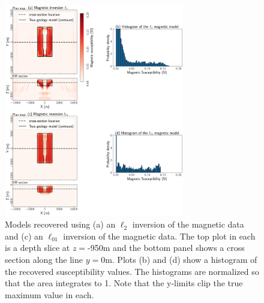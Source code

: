 \begin{figure}[!htb]
    \begin{center}
    \includegraphics[width=0.7\textwidth]{figures/magnetic_l22_lpq.png}
    \end{center}
\caption{
    Models recovered using (a) an $\ell_2$ inversion of the magnetic data and (c) an $\ell_{01}$ inversion of the magnetic data. The top plot in each is a depth slice at $z=$-950m and the bottom panel shows a cross section along the line $y=0$m. Plots (b) and (d) show a histogram of the recovered susceptibility values. The histograms are normalized so that the area integrates to 1. Note that the y-limits clip the true maximum value in each.
}
\label{fig:magnetics-inversion}
\end{figure}
